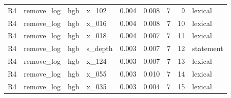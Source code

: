 {\begin{longtable}{llllrrrrl}
R4 & remove\_log & hgb & x\_102 & 0.004 & 0.008 & 7 & 9 & lexical \\
R4 & remove\_log & hgb & x\_016 & 0.004 & 0.008 & 7 & 10 & lexical \\
R4 & remove\_log & hgb & x\_018 & 0.004 & 0.007 & 7 & 11 & lexical \\
R4 & remove\_log & hgb & s\_depth & 0.003 & 0.007 & 7 & 12 & statement \\
R4 & remove\_log & hgb & x\_124 & 0.003 & 0.007 & 7 & 13 & lexical \\
R4 & remove\_log & hgb & x\_055 & 0.003 & 0.010 & 7 & 14 & lexical \\
R4 & remove\_log & hgb & x\_035 & 0.003 & 0.004 & 7 & 15 & lexical \\
\end{longtable}
}

